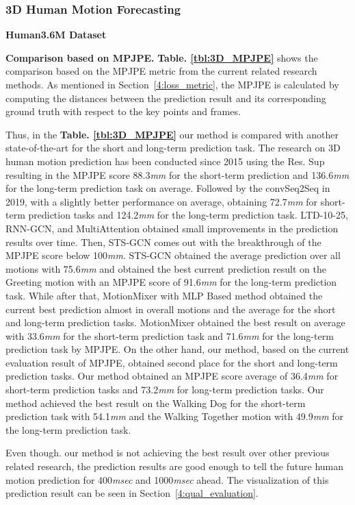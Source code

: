\subsubsection{3D Human Motion Forecasting}\label{4:quant_2D}
\textbf{Human3.6M Dataset}

\textbf{Comparison based on MPJPE.} \textbf{Table. \ref{tbl:3D_MPJPE}} shows the comparison based on the MPJPE metric from the current related research methods. As mentioned in Section~\ref{4:loss_metric}, the MPJPE is calculated by computing the distances between the prediction result and its corresponding ground truth with respect to the key points and frames. 

Thus, in the \textbf{Table. \ref{tbl:3D_MPJPE}} our method is compared with another state-of-the-art for the short and long-term prediction task. The research on 3D human motion prediction has been conducted since 2015 using the Res. Sup resulting in the MPJPE score 88.3\textit{mm} for the short-term prediction and 136.6\textit{mm} for the long-term prediction task on average. Followed by the convSeq2Seq in 2019, with a slightly better performance on average, obtaining 72.7\textit{mm} for short-term prediction tasks and 124.2\textit{mm} for the long-term prediction task. LTD-10-25, RNN-GCN, and MultiAttention obtained small improvements in the prediction results over time. Then, STS-GCN comes out with the breakthrough of the MPJPE score below 100\textit{mm}. STS-GCN obtained the average prediction over all motions with 75.6\textit{mm} and obtained the best current prediction result on the Greeting motion with an MPJPE score of 91.6\textit{mm} for the long-term prediction task. While after that, MotionMixer with MLP Based method obtained the current best prediction almost in overall motions and the average for the short and long-term prediction tasks. MotionMixer obtained the best result on average with 33.6\textit{mm} for the short-term prediction task and 71.6\textit{mm} for the long-term prediction task by MPJPE. On the other hand, our method, based on the current evaluation result of MPJPE, obtained second place for the short and long-term prediction tasks. Our method obtained an MPJPE score average of 36.4\textit{mm} for short-term prediction tasks and 73.2\textit{mm} for long-term prediction tasks. Our method achieved the best result on the Walking Dog for the short-term prediction task with 54.1\textit{mm} and the Walking Together motion with 49.9\textit{mm} for the long-term prediction task. 

Even though. our method is not achieving the best result over other previous related research, the prediction results are good enough to tell the future human motion prediction for 400\textit{msec} and 1000\textit{msec} ahead. The visualization of this prediction result can be seen in Section~\ref{4:qual_evaluation}.

